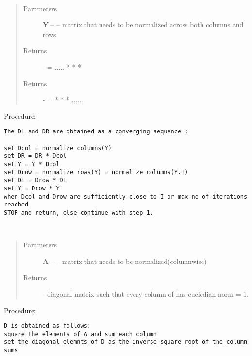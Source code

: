\documentclass[letterpaper,10pt,english]{sphinxmanual}
\begin{document}
\begin{fulllineitems}
\label{index:brake.initialize.diagscale.norm_rc}~\begin{quote}\begin{description}
\item[{Parameters}] \leavevmode
\textbf{Y} -- -- matrix that needs to be normalized across both columns and rows

\item[{Returns}] \leavevmode
{} -   = .....  *  *  * 

\item[{Returns}] \leavevmode
{} -   =  *  *  * ......

\end{description}\end{quote}

Procedure:

\begin{Verbatim}[commandchars=\\\{\}]
The DL and DR are obtained as a converging sequence :

set Dcol = normalize columns(Y)
set DR = DR * Dcol
set Y = Y * Dcol
set Drow = normalize rows(Y) = normalize columns(Y.T)
set DL = Drow * DL
set Y = Drow * Y
when Dcol and Drow are sufficiently close to I or max no of iterations reached
STOP and return, else continue with step 1.
\end{Verbatim}

\end{fulllineitems}


\begin{fulllineitems}
\label{index:brake.initialize.diagscale.normalize_cols}~\begin{quote}\begin{description}
\item[{Parameters}] \leavevmode
\textbf{A} -- -- matrix that needs to be normalized(columnwise)

\item[{Returns}] \leavevmode
{} - diagonal matrix such that every column of  has eucledian norm = 1.

\end{description}\end{quote}

Procedure:

\begin{Verbatim}[commandchars=\\\{\}]
D is obtained as follows:
square the elements of A and sum each column
set the diagonal elemnts of D as the inverse square root of the column sums
\end{Verbatim}

\end{fulllineitems}
\end{document}
